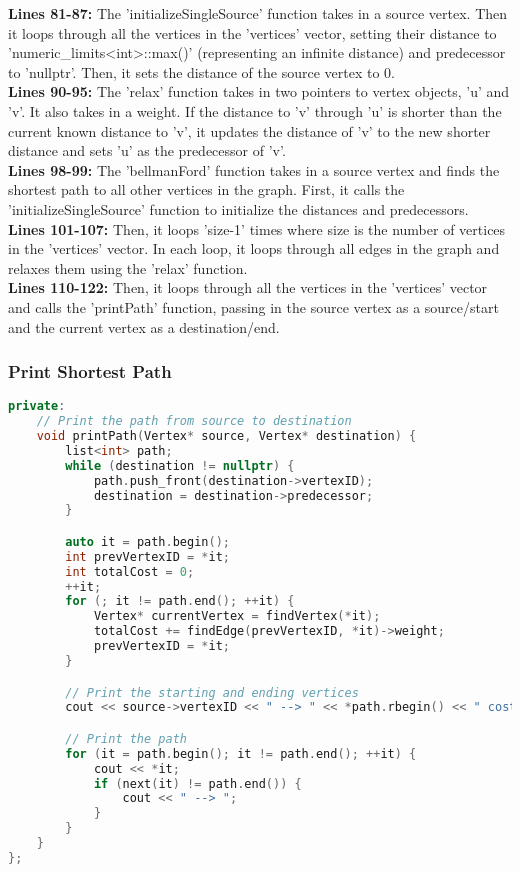 \documentclass[letterpaper, 10pt,DIV=13]{scrartcl}
\numberwithin{equation}{section} %
\numberwithin{figure}{section} %
\numberwithin{table}{section} %
\begin{document}
\textbf{Lines 81-87:} The 'initializeSingleSource' function takes in a source vertex. Then it loops through all the vertices in the 'vertices' vector, setting their distance to 'numeric_limits<int>::max()' (representing an infinite distance) and predecessor to 'nullptr'. Then, it sets the distance of the source vertex to 0. \\
\textbf{Lines 90-95:} The 'relax' function takes in two pointers to vertex objects, 'u' and 'v'. It also takes in a weight. If the distance to 'v' through 'u' is shorter than the current known distance to 'v', it updates the distance of 'v' to the new shorter distance and sets 'u' as the predecessor of 'v'.\\
\textbf{Lines 98-99:} The 'bellmanFord' function takes in a source vertex and finds the shortest path to all other vertices in the graph. First, it calls the 'initializeSingleSource' function to initialize the distances and predecessors. \\
\textbf{Lines 101-107:} Then, it loops 'size-1' times where size is the number of vertices in the 'vertices' vector. In each loop, it loops through all edges in the graph and relaxes them using the 'relax' function. \\
\textbf{Lines 110-122:} Then, it loops through all the vertices in the 'vertices' vector and calls the 'printPath' function, passing in the source vertex as a source/start and the current vertex as a destination/end.


\subsubsection{Print Shortest Path}
\begin{linenumbers}
\begin{lstlisting}[language=C++, caption={Print Shortest Path}, label={code:example}]
private:
    // Print the path from source to destination
    void printPath(Vertex* source, Vertex* destination) {
        list<int> path;
        while (destination != nullptr) {
            path.push_front(destination->vertexID);
            destination = destination->predecessor;
        }

        auto it = path.begin();
        int prevVertexID = *it;
        int totalCost = 0;
        ++it;
        for (; it != path.end(); ++it) {
            Vertex* currentVertex = findVertex(*it);
            totalCost += findEdge(prevVertexID, *it)->weight;
            prevVertexID = *it;
        }

        // Print the starting and ending vertices
        cout << source->vertexID << " --> " << *path.rbegin() << " cost is " << totalCost << "; path: ";

        // Print the path
        for (it = path.begin(); it != path.end(); ++it) {
            cout << *it;
            if (next(it) != path.end()) {
                cout << " --> ";
            }
        }
    }
};
\end{lstlisting}
\end{linenumbers}
\nolinenumbers
\end{document}
